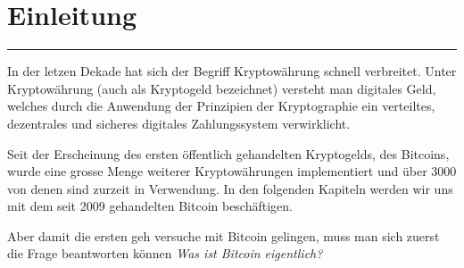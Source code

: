 \vspace*{1mm}
\section*{Einleitung}
\vspace{-10mm}
\noindent\rule{0.8\textwidth}{0.4pt}

\vspace{5mm}

\noindent
In der letzen Dekade hat sich der Begriff Kryptowährung schnell verbreitet. Unter Kryptowährung
(auch als Kryptogeld bezeichnet) versteht man digitales Geld, welches durch die Anwendung
der Prinzipien der Kryptographie ein verteiltes, dezentrales und sicheres digitales Zahlungssystem
verwirklicht.

\noindent
Seit der Erscheinung des ersten öffentlich gehandelten Kryptogelds, des Bitcoins, wurde eine grosse
Menge weiterer Kryptowährungen implementiert und über 3000 von denen sind zurzeit in Verwendung. In
den folgenden Kapiteln werden wir uns mit dem seit 2009 gehandelten Bitcoin beschäftigen.

\noindent
Aber damit die ersten geh versuche mit Bitcoin gelingen, muss man sich zuerst die Frage beantworten
können \emph{\dq Was ist Bitcoin eigentlich?\dq}


\newpage
